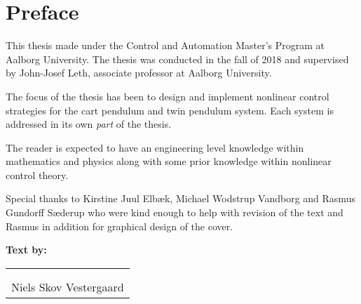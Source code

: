 %
\chapter*{Preface}
\vspace{-12 pt}
This thesis made under the Control and Automation Master's Program at Aalborg University. The thesis was conducted in the fall of 2018 and supervised by John-Josef Leth, associate professor at Aalborg University.

The focus of the thesis has been to design and implement nonlinear control strategies for the cart pendulum and twin pendulum system. Each system is addressed in its own \textit{part} of the thesis.

The reader is expected to have an engineering level knowledge within mathematics and physics along with some prior knowledge within nonlinear control theory.

Special thanks to Kirstine Juul Elbæk, Michael Wodstrup Vandborg and Rasmus Gundorff Sæderup who were kind enough to help with revision of the text and Rasmus in addition for graphical design of the cover.

%
\textbf{Text by:}\\
\vspace{-12 pt}
\begin{table}[H]
	\centering
		\begin{tabular}{c c c}
			&&\\
	    \multicolumn{3}{c}{\underline{\phantom{- Niels Skov Vestergaard -}}}\\
	    \multicolumn{3}{c}{Niels Skov Vestergaard}\\				
		\end{tabular}
\end{table}
\pagebreak